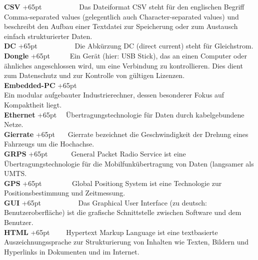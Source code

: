\documentclass[fontsize = 12pt, paper = a4]{scrreprt}
\begin{document}
\textbf{CSV}
\hangindent+65pt 
\ \ \ \ \ \ \ \ \ \  Das Dateiformat CSV steht für den englischen Begriff Comma-separated values (gelegentlich auch Character-separated values) und beschreibt den Aufbau einer Textdatei zur Speicherung oder zum Austausch einfach strukturierter Daten.\\

\textbf{DC}
\hangindent+65pt 
\ \ \ \ \ \ \ \ \ \ Die Abkürzung DC (direct current) steht für Gleichstrom.\\

\textbf{Dongle}
\hangindent+65pt 
\ \ \ \ \ Ein Gerät (hier: USB Stick), das an einen Computer oder ähnliches angeschlossen wird, um eine Verbindung zu kontrollieren. Dies dient zum Datenschutz und zur Kontrolle von gültigen Lizenzen.\\

\textbf{Embedded-PC}
\hangindent+65pt  \\
Ein modular aufgebauter Industrierechner, dessen besonderer Fokus auf Kompaktheit liegt.\\

\textbf{Ethernet}
\hangindent+65pt  
\ \ Übertragungstechnologie für Daten durch kabelgebundene Netze.\\

\textbf{Gierrate}
\hangindent+65pt  
\ \ \ Gierrate bezeichnet die Geschwindigkeit der Drehung eines Fahrzeugs um die Hochachse.\\

\textbf{GRPS}
\hangindent+65pt  
\ \ \ \ \ \ General Packet Radio Service ist eine Übertragungstechnologie für die Mobilfunkübertragung von Daten (langsamer als UMTS.\\

\textbf{GPS}
\hangindent+65pt  
\ \ \ \ \ \ \  \ Global Positiong System ist eine Technologie zur Positionsbestimmung und Zeitmessung.\\

\textbf{GUI}
\hangindent+65pt  
\ \ \ \ \ \ \ \ \ \   Das Graphical User Interface (zu deutsch: Benutzeroberfläche) ist die graf\-ische Schnittstelle zwischen Software und dem Benutzer.\\

\textbf{HTML}
\hangindent+65pt 
\ \ \ \ Hypertext Markup Language ist eine textbasierte Auszeichnungssprache zur Strukturierung von Inhalten wie Texten, Bildern und Hyperlinks in Dokumenten und im Internet.\\
\end{document}
